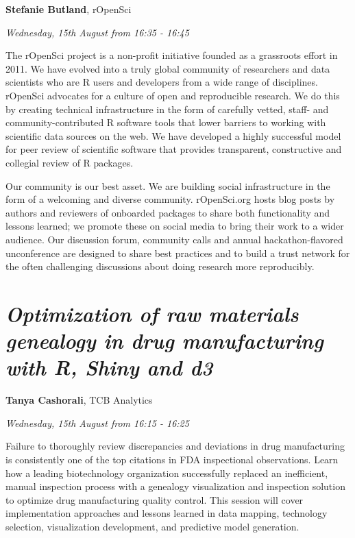 \documentclass[]{book}
\theoremstyle{definition}
\theoremstyle{definition}
\theoremstyle{definition}
\theoremstyle{remark}
\begin{document}
\textbf{Stefanie Butland}, rOpenSci

\emph{Wednesday, 15th August from 16:35 - 16:45}

The rOpenSci project is a non-profit initiative founded as a grassroots
effort in 2011. We have evolved into a truly global community of
researchers and data scientists who are R users and developers from a
wide range of disciplines. rOpenSci advocates for a culture of open and
reproducible research. We do this by creating technical infrastructure
in the form of carefully vetted, staff- and community-contributed R
software tools that lower barriers to working with scientific data
sources on the web. We have developed a highly successful model for peer
review of scientific software that provides transparent, constructive
and collegial review of R packages.

Our community is our best asset. We are building social infrastructure
in the form of a welcoming and diverse community. rOpenSci.org hosts
blog posts by authors and reviewers of onboarded packages to share both
functionality and lessons learned; we promote these on social media to
bring their work to a wider audience. Our discussion forum, community
calls and annual hackathon-flavored unconference are designed to share
best practices and to build a trust network for the often challenging
discussions about doing research more reproducibly.

\hypertarget{optimization-of-raw-materials-genealogy-in-drug-manufacturing-with-r-shiny-and-d3}{%
\section{\texorpdfstring{\emph{Optimization of raw materials genealogy
in drug manufacturing with R, Shiny and
d3}}{Optimization of raw materials genealogy in drug manufacturing with R, Shiny and d3}}\label{optimization-of-raw-materials-genealogy-in-drug-manufacturing-with-r-shiny-and-d3}}

\textbf{Tanya Cashorali}, TCB Analytics

\emph{Wednesday, 15th August from 16:15 - 16:25}

Failure to thoroughly review discrepancies and deviations in drug
manufacturing is consistently one of the top citations in FDA
inspectional observations. Learn how a leading biotechnology
organization successfully replaced an inefficient, manual inspection
process with a genealogy visualization and inspection solution to
optimize drug manufacturing quality control. This session will cover
implementation approaches and lessons learned in data mapping,
technology selection, visualization development, and predictive model
generation.
\end{document}
